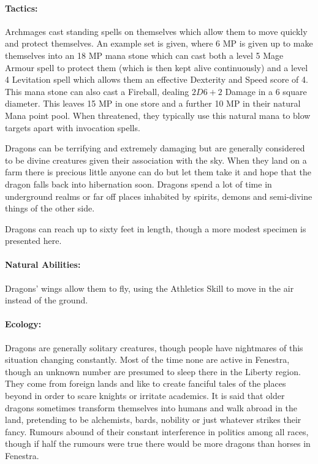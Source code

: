 \begin{multicols}{2}
\paragraph{Tactics:} Archmages cast standing spells on themselves which allow them to move quickly and protect themselves.
An example set is given, where 6 MP is given up to make themselves into an 18 MP mana stone which can cast both a level 5 Mage Armour spell to protect them (which is then kept alive continuously) and a level 4 Levitation spell which allows them an effective Dexterity and Speed score of 4.
This mana stone can also cast a Fireball, dealing $2D6+2$ Damage in a 6 square diameter.
This leaves 15 MP in one store and a further 10 MP in their natural Mana point pool.
When threatened, they typically use this natural mana to blow targets apart with invocation spells.

\label{dragon}

Dragons can be terrifying and extremely damaging but are generally considered to be divine creatures given their association with the sky.
When they land on a farm there is precious little anyone can do but let them take it and hope that the dragon falls back into hibernation soon.
Dragons spend a lot of time in underground realms or far off places inhabited by spirits, demons and semi-divine things of the other side.

Dragons can reach up to sixty feet in length, though a more modest specimen is presented here.

\paragraph{Natural Abilities:}
Dragons' wings allow them to fly, using the Athletics Skill to move in the air instead of the ground.

\paragraph{Ecology:} Dragons are generally solitary creatures, though people have nightmares of this situation changing constantly.
Most of the time none are active in Fenestra, though an unknown number are presumed to sleep there in the Liberty region.
They come from foreign lands and like to create fanciful tales of the places beyond in order to scare knights or irritate academics.
It is said that older dragons sometimes transform themselves into humans and walk abroad in the land, pretending to be alchemists, bards, nobility or just whatever strikes their fancy.
Rumours abound of their constant interference in politics among all races, though if half the rumours were true there would be more dragons than horses in Fenestra.


\end{multicols}
